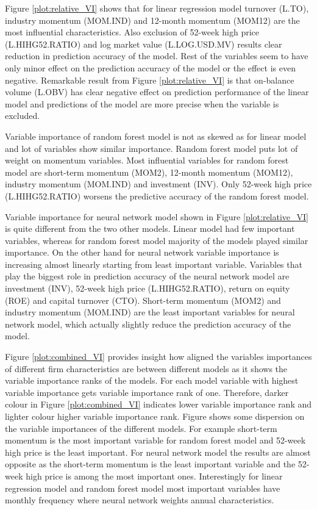 \documentclass[12pt]{article}
\begin{document}
Figure \ref{plot:relative_VI} shows that for linear regression model turnover (L.TO), industry momentum (MOM.IND) and 12-month momentum (MOM12) are the most influential characteristics. Also exclusion of 52-week high price (L.HIHG52.RATIO) and log market value (L.LOG.USD.MV) results clear reduction in prediction accuracy of the model. Rest of the variables seem to have only minor effect on the prediction accuracy of the model or the effect is even negative. Remarkable result from Figure \ref{plot:relative_VI} is that on-balance volume (L.OBV) has clear negative effect on prediction performance of the linear model and predictions of the model are more precise when the variable is excluded. \par

Variable importance of random forest model is not as skewed as for linear model and lot of variables show similar importance. Random forest model puts lot of weight on momentum variables. Most influential variables for random forest model are short-term momentum (MOM2), 12-month momentum (MOM12), industry momentum (MOM.IND) and investment (INV). Only 52-week high price (L.HIHG52.RATIO) worsens the predictive accuracy of the random forest model. \par

Variable importance for neural network model shown in Figure \ref{plot:relative_VI} is quite different from the two other models. Linear model had few important variables, whereas for random forest model majority of the models played similar importance. On the other hand for neural network variable importance is increasing almost linearly starting from least important variable. Variables that play the biggest role in prediction accuracy of the neural network model are investment (INV), 52-week high price (L.HIHG52.RATIO), return on equity (ROE) and capital turnover (CTO). Short-term momentum (MOM2) and industry momentum (MOM.IND) are the least important variables for neural network model, which actually slightly reduce the prediction accuracy of the model. \par 

Figure \ref{plot:combined_VI} provides insight how aligned the variables importances of different firm characteristics are between different models as it shows the variable importance ranks of the models. For each model variable with highest variable importance gets variable importance rank of one. Therefore, darker colour in Figure \ref{plot:combined_VI} indicates lower variable importance rank and lighter colour higher variable importance rank. Figure shows some dispersion on the variable importances of the different models. For example short-term momentum is the most important variable for random forest model and 52-week high price is the least important. For neural network model the results are almost opposite as the short-term momentum is the least important variable and the 52-week high price is among the most important ones. Interestingly for linear regression model and random forest model most important variables have monthly frequency where neural network weights annual characteristics. \par
\end{document}

